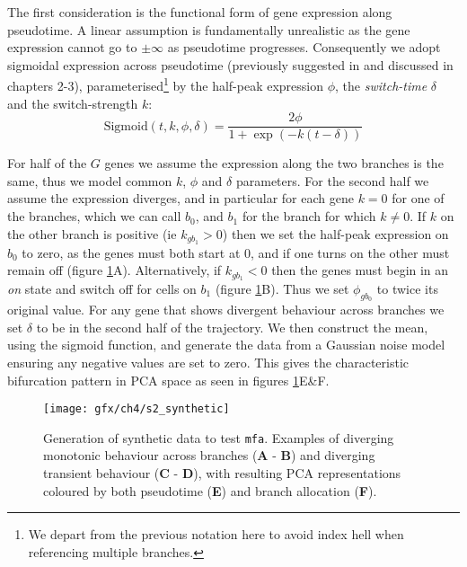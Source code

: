 The first consideration is the functional form of gene expression along pseudotime. A linear assumption is fundamentally unrealistic as the gene expression cannot go to $\pm \infty$ as pseudotime progresses. Consequently we adopt sigmoidal expression across pseudotime (previously suggested in \cite{campbell2016order,campbell2016switchde} and discussed in chapters 2-3), parameterised\footnote{We depart from the previous notation here to avoid index hell when referencing multiple branches.} by the half-peak expression $\phi$, the \emph{switch-time} $\delta$ and the switch-strength $k$:
\begin{equation}\label{eq:sigmoid}
      \text{Sigmoid}(t, k, \phi, \delta)  = \frac{2 \phi}{1 + \exp(-k(t - \delta))}
\end{equation}


For half of the $G$ genes we assume the expression along the two branches is the same, thus we model common $k$, $\phi$ and $\delta$ parameters. For the second half we assume the expression diverges, and in particular for each gene $k = 0$ for one of the branches, which we can call $b_0$, and $b_1$ for the branch for which $k \neq 0$. If $k$ on the other branch is positive (ie $k_{gb_1} > 0$) then we set the half-peak expression on $b_0$ to zero, as the genes must both start at 0, and if one turns on the other must remain off (figure \ref{fig:mfa_synthetic}A).
Alternatively, if $k_{gb_1} < 0$ then the genes must begin in an \emph{on} state and switch off for cells on $b_1$ (figure \ref{fig:mfa_synthetic}B). Thus we set $\phi_{gb_0}$ to twice its original value. For any gene that shows divergent behaviour across branches we set $\delta$ to be in the second half of the trajectory. We then construct the mean, using the sigmoid function, and generate the data from a Gaussian noise model ensuring any negative values are set to zero. This gives the characteristic bifurcation pattern in PCA space as seen in figures \ref{fig:mfa_synthetic}E\&F.


\begin{figure}
	\centering
	\texttt{[image: gfx/ch4/s2\_synthetic]}
	\caption{Generation of synthetic data to test \texttt{mfa}. Examples of diverging monotonic behaviour across branches (\textbf{A} - \textbf{B}) and diverging transient behaviour (\textbf{C} - \textbf{D}), with resulting PCA representations coloured by both pseudotime (\textbf{E}) and branch allocation (\textbf{F}).} \label{fig:mfa_synthetic}
\end{figure}

